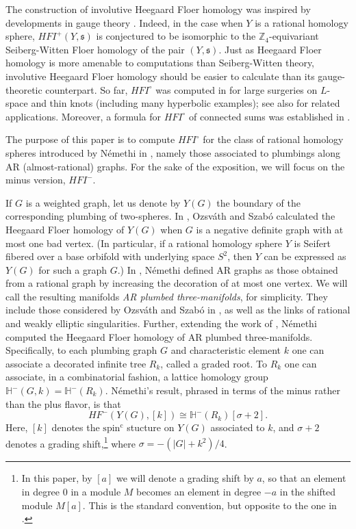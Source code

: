 \documentclass[11 pt]{amsart}
\theoremstyle{remark}
\newcommand\Z{\mathbb{Z}}
\def\spinc {{\operatorname{spin^c}}}
\def\s{\mathfrak s}
\def\He{\mathbb{H}}
\def\HF {\mathit{HF}}
\newcommand \HFm {\HF^-}
\def\HFI {\mathit{HFI}}
\newcommand\HFIp {\HFI^+}
\newcommand \HFIm {\HFI^-}
\newcommand \HFIo {\HFI^{\circ}}
\begin{document}
The construction of involutive Heegaard Floer homology was inspired by developments in gauge theory \cite{Triangulations, Lin, Stoffregen}. Indeed, in the case when $Y$ is a rational homology sphere, $\HFIp(Y, \s)$ is conjectured to be isomorphic to the $\Z_4$-equivariant Seiberg-Witten Floer homology of the pair $(Y, \s)$. Just as Heegaard Floer homology is more amenable to computations than Seiberg-Witten theory, involutive Heegaard Floer homology should be easier to calculate than its gauge-theoretic counterpart. So far, $\HFIo$ was computed in \cite{HMinvolutive} for large surgeries on $L$-space and thin knots (including many hyperbolic examples); see also \cite{BorodzikHom} for related applications. Moreover, a formula for $\HFIo$ of connected sums was established in \cite{HMZ}.

The purpose of this paper is to compute $\HFIo$ for the class of rational homology spheres introduced by N{\'e}methi in \cite{NemethiOS}, namely those associated to plumbings along AR (almost-rational) graphs. For the sake of the exposition, we will focus on the minus version, $\HFIm$.

If $G$ is a weighted graph, let us denote by $Y(G)$ the boundary of the corresponding plumbing of two-spheres. In \cite{Plumbed},  Ozsv\'ath and Szab\'o calculated the  Heegaard Floer homology of $Y(G)$ when $G$ is a negative definite graph with at most one bad vertex. (In particular, if a rational homology sphere $Y$ is Seifert fibered over a base orbifold with underlying space $S^2$, then $Y$ can be expressed as $Y(G)$ for such a graph $G$.) In \cite{NemethiOS}, N{\'e}methi defined AR graphs as those obtained from a rational graph by increasing the decoration of at most one vertex. We will call the resulting manifolds {\em AR plumbed three-manifolds}, for simplicity. They include those considered by Ozsv\'ath and Szab\'o in \cite{Plumbed}, as well as the links of rational and weakly elliptic singularities. Further, extending the work of \cite{Plumbed}, N{\'e}methi computed the Heegaard Floer homology of AR plumbed three-manifolds. Specifically, to each plumbing graph $G$ and characteristic element $k$ one can associate a decorated infinite tree $R_k$, called a graded root. To $R_k$ one can associate, in a combinatorial fashion, a lattice homology group $\He^-(G, k)=\He^-(R_k)$. N{\'e}methi's result, phrased in terms of the minus rather than the plus flavor, is that
$$ \HFm(Y(G), [k]) \cong \He^-(R_k)[\sigma+2].$$
Here, $[k]$ denotes the $\spinc$ stucture on $Y(G)$ associated to $k$, and $\sigma + 2$ denotes a  grading shift,\footnote{In this paper, by $[a]$ we will denote a grading shift by $a$, so that an element in degree $0$ in a module $M$ becomes an element in degree $-a$ in the shifted module $M[a].$ This is the standard convention, but opposite to the one in \cite{NemethiOS}.} where $\sigma=-({|G| + k^2})/{4}$.
\end{document}
